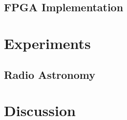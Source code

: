 \documentclass{article}
\begin{document}
\subsection{FPGA Implementation}
\section{Experiments}
\subsection{Radio Astronomy}
\section{Discussion}








\cite{iht}
\cite{niht}
\cite{greedy_algorithms}
\nocite{langley00}



\end{document}

